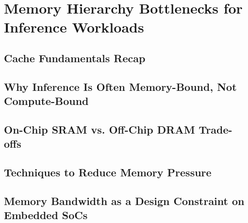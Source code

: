 \chapter{Memory Hierarchy Bottlenecks for Inference Workloads}
\label{ch:memory}


\section{Cache Fundamentals Recap}

\section{Why Inference Is Often Memory-Bound, Not Compute-Bound}

\section{On-Chip SRAM vs. Off-Chip DRAM Trade-offs}

\section{Techniques to Reduce Memory Pressure}

\section{Memory Bandwidth as a Design Constraint on Embedded SoCs}
